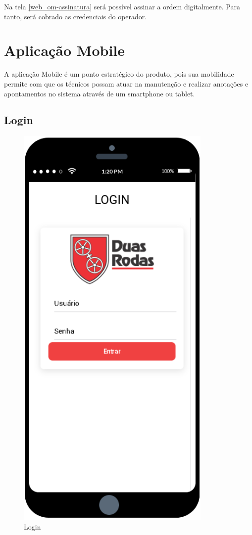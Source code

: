 {	Na tela \ref{web_om-assinatura} será possível assinar a ordem digitalmente. Para tanto, será cobrado as credenciais do operador.
	
	\newpage
	\section{Aplicação Mobile}
	A aplicação Mobile é um ponto estratégico do produto, pois sua mobilidade permite com que os técnicos possam atuar na manutenção e realizar anotações e apontamentos no sistema através de um smartphone ou tablet.
	
	\subsection{Login}
	
	\begin{figure}[htb]
		\caption{\label{mobile_login}Login}
		\begin{center}
			\includegraphics[scale=0.80]{./Figuras/mobile/login.png}
		\end{center}
	\end{figure}
	
}
